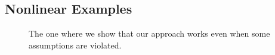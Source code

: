 \subsection{Nonlinear Examples}

\begin{frame}[t]
\centering
\begin{figure}
\centering

The one where we show that our approach works even when some assumptions are violated.

\end{figure}

\end{frame}
